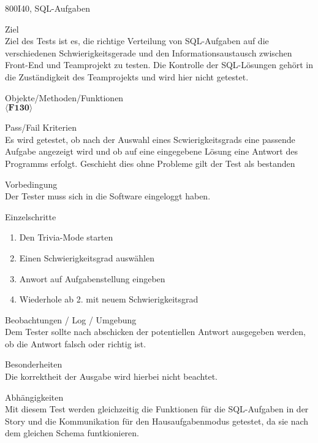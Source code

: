 \begin{testcase}{800}{I40, SQL-Aufgaben}
\label{T800}
\item[Ziel]~\\
Ziel des Tests ist es, die richtige Verteilung von SQL-Aufgaben auf die verschiedenen Schwierigkeitsgerade und den Informationsaustausch zwischen Front-End und Teamprojekt zu testen. Die Kontrolle der SQL-Lösungen gehört in die Zuständigkeit des Teamprojekts und wird hier nicht getestet.
\item[Objekte/Methoden/Funktionen]~\\
$\langle\textbf{F130}\rangle$
\item[Pass/Fail Kriterien]~\\
Es wird getestet, ob nach der Auswahl eines Scwierigkeitsgrads eine passende Aufgabe angezeigt wird und ob auf eine eingegebene Lösung eine Antwort des Programms erfolgt. Geschieht dies ohne Probleme gilt der Test als bestanden
\item[Vorbedingung]~\\
Der Tester muss sich in die Software eingeloggt haben. 
\item[Einzelschritte]~\\
\begin{enumerate}
	\item Den Trivia-Mode starten\\
	\item Einen Schwierigkeitsgrad auswählen \\
	\item Anwort auf Aufgabenstellung eingeben\\
	\item Wiederhole ab 2. mit neuem Schwierigkeitsgrad\\
\end{enumerate}
\item[Beobachtungen / Log / Umgebung]~\\ 
Dem Tester sollte nach abschicken der potentiellen Antwort ausgegeben werden, ob die Antwort falsch oder richtig ist.
\item[Besonderheiten]~\\
Die korrektheit der Ausgabe wird hierbei nicht beachtet.
\item[Abhängigkeiten]~\\
Mit diesem Test werden gleichzeitig die Funktionen für die SQL-Aufgaben in der Story und die Kommunikation für den Hausaufgabenmodus getestet, da sie nach dem gleichen Schema funtkionieren.
\end{testcase}

